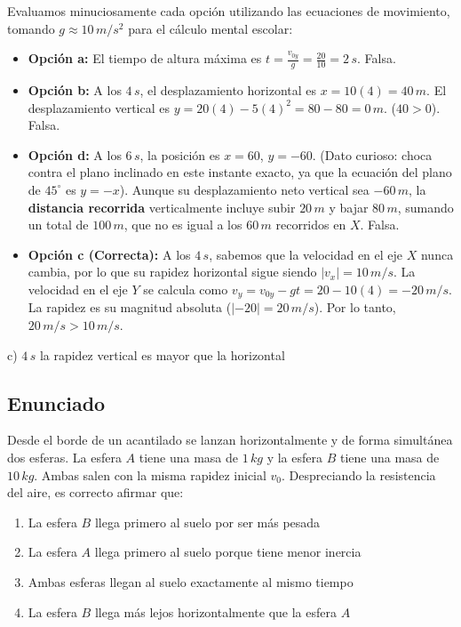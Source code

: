 \documentclass[12pt, a4paper]{article}
\begin{document}
Evaluamos minuciosamente cada opción utilizando las ecuaciones de movimiento, tomando $g \approx 10\,\si{m/s^2}$ para el cálculo mental escolar:
\begin{itemize}
    \item \textbf{Opción a:} El tiempo de altura máxima es $t = \frac{v_{0y}}{g} = \frac{20}{10} = 2\,\si{s}$. Falsa.
    \item \textbf{Opción b:} A los $4\,\si{s}$, el desplazamiento horizontal es $x = 10(4) = 40\,\si{m}$. El desplazamiento vertical es $y = 20(4) - 5(4)^2 = 80 - 80 = 0\,\si{m}$. ($40 > 0$). Falsa.
    \item \textbf{Opción d:} A los $6\,\si{s}$, la posición es $x=60$, $y=-60$. (Dato curioso: choca contra el plano inclinado en este instante exacto, ya que la ecuación del plano de $45^\circ$ es $y = -x$). Aunque su desplazamiento neto vertical sea $-60\,\si{m}$, la \textbf{distancia recorrida} verticalmente incluye subir $20\,\si{m}$ y bajar $80\,\si{m}$, sumando un total de $100\,\si{m}$, que no es igual a los $60\,\si{m}$ recorridos en $X$. Falsa.
    \item \textbf{Opción c (Correcta):} A los $4\,\si{s}$, sabemos que la velocidad en el eje $X$ nunca cambia, por lo que su rapidez horizontal sigue siendo $|v_x| = 10\,\si{m/s}$. La velocidad en el eje $Y$ se calcula como $v_y = v_{0y} - gt = 20 - 10(4) = -20\,\si{m/s}$. La rapidez es su magnitud absoluta ($|-20| = 20\,\si{m/s}$). Por lo tanto, $20\,\si{m/s} > 10\,\si{m/s}$.
\end{itemize}

\begin{tcolorbox}[colback=green!5!white, colframe=green!50!black, title=Respuesta Final]
\centering \Large c) $4\,\si{s}$ la rapidez vertical es mayor que la horizontal
\end{tcolorbox}

\newpage

\subsection*{Enunciado}
Desde el borde de un acantilado se lanzan horizontalmente y de forma simultánea dos esferas. La esfera $A$ tiene una masa de $1\,\si{kg}$ y la esfera $B$ tiene una masa de $10\,\si{kg}$. Ambas salen con la misma rapidez inicial $v_0$. Despreciando la resistencia del aire, es correcto afirmar que:
\begin{enumerate}[label=\alph*)]
    \item La esfera $B$ llega primero al suelo por ser más pesada
    \item La esfera $A$ llega primero al suelo porque tiene menor inercia
    \item Ambas esferas llegan al suelo exactamente al mismo tiempo
    \item La esfera $B$ llega más lejos horizontalmente que la esfera $A$
\end{enumerate}
\end{document}
